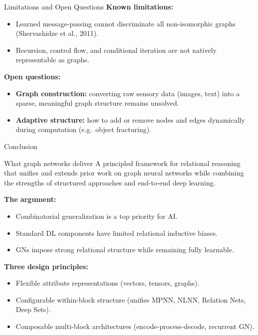 \documentclass[10pt]{beamer}
\begin{document}
\begin{frame}{Limitations and Open Questions}
\textbf{Known limitations:}
\begin{itemize}
    \item Learned message-passing cannot discriminate all non-isomorphic graphs
    (Shervashidze et al., 2011).
    \item Recursion, control flow, and conditional iteration are not natively
    representable as graphs.
\end{itemize}

\vspace{0.3cm}
\textbf{Open questions:}
\begin{itemize}
    \item \textbf{Graph construction:} converting raw sensory data (images, text)
    into a sparse, meaningful graph structure remains unsolved.
    \item \textbf{Adaptive structure:} how to add or remove nodes and edges
    dynamically during computation (e.g.\ object fracturing).
\end{itemize}
\end{frame}

\begin{frame}{Conclusion}
\begin{block}{What graph networks deliver}
A principled framework for relational reasoning that unifies and extends prior
work on graph neural networks while combining the strengths of structured
approaches and end-to-end deep learning.
\end{block}

\vspace{0.1cm}
\textbf{The argument:}
\begin{itemize}
    \item Combinatorial generalization is a top priority for AI.
    \item Standard DL components have limited relational inductive biases.
    \item GNs impose strong relational structure while remaining fully learnable.
\end{itemize}

\vspace{0.1cm}
\textbf{Three design principles:}
\begin{itemize}
    \item Flexible attribute representations (vectors, tensors, graphs).
    \item Configurable within-block structure (unifies MPNN, NLNN, Relation Nets, Deep Sets).
    \item Composable multi-block architectures (encode-process-decode, recurrent GN).
\end{itemize}
\end{frame}
\end{document}
